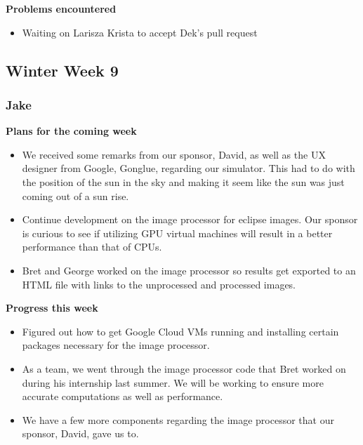 \documentclass[10pt, onecolumn, draftclsnofoot, letterpaper, compsoc]{IEEEtran}
\begin{document}
    \noindent \textbf{Problems encountered}

    \begin{itemize}

    \item Waiting on Larisza Krista to accept Dek's pull request

    \end{itemize}

\subsection{Winter Week 9}

    \subsubsection{Jake}

    \noindent \textbf{Plans for the coming week}

    \begin{itemize}

    \item We received some remarks from our sponsor, David, as well as the UX designer from Google, Gonglue, regarding our simulator. This had to do with the position of the sun in the sky and making it seem like the sun was just coming out of a sun rise.
    \item Continue development on the image processor for eclipse images. Our sponsor is curious to see if utilizing GPU virtual machines will result in a better performance than that of CPUs.
    \item Bret and George worked on the image processor so results get exported to an HTML file with links to the unprocessed and processed images.

    \end{itemize}

    \noindent \textbf{Progress this week}

    \begin{itemize}

    \item Figured out how to get Google Cloud VMs running and installing certain packages necessary for the image processor.
    \item As a team, we went through the image processor code that Bret worked on during his internship last summer. We will be working to ensure more accurate computations as well as performance.
    \item We have a few more components regarding the image processor that our sponsor, David, gave us to.

    \end{itemize}
\end{document}
